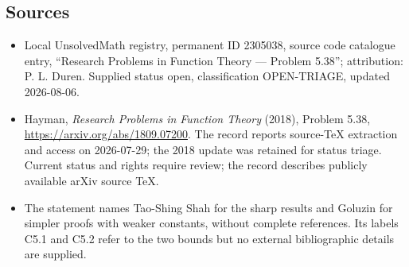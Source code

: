 \documentclass[11pt]{article}
\begin{document}
\subsection{Sources}
\begin{itemize}
\item Local UnsolvedMath registry, permanent ID 2305038, source code catalogue entry, ``Research Problems in Function Theory --- Problem 5.38''; attribution: P. L. Duren. Supplied status open, classification OPEN-TRIAGE, updated 2026-08-06.
\item Hayman, \emph{Research Problems in Function Theory} (2018), Problem 5.38, \url{https://arxiv.org/abs/1809.07200}. The record reports source-TeX extraction and access on 2026-07-29; the 2018 update was retained for status triage. Current status and rights require review; the record describes publicly available arXiv source TeX.
\item The statement names Tao-Shing Shah for the sharp results and Goluzin for simpler proofs with weaker constants, without complete references. Its labels C5.1 and C5.2 refer to the two bounds but no external bibliographic details are supplied.
\end{itemize}
\end{document}
